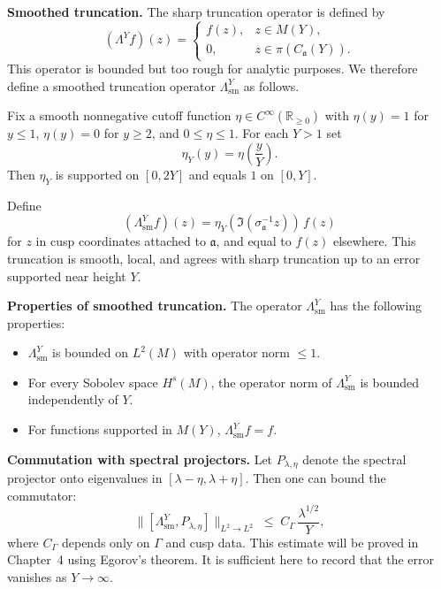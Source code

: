 \medskip

\noindent\textbf{Smoothed truncation.}
The sharp truncation operator is defined by
\[
  (\Lambda^{Y} f)(z) =
  \begin{cases}
    f(z), & z\in M(Y), \\
    0, & z\in \pi(C_{\mathfrak{a}}(Y)).
  \end{cases}
\]
This operator is bounded but too rough for analytic purposes.
We therefore define a smoothed truncation operator $\Lambda^{Y}_{\mathrm{sm}}$ as follows.

\medskip

Fix a smooth nonnegative cutoff function $\eta\in C^{\infty}(\mathbb{R}_{\ge0})$ with
$\eta(y)=1$ for $y\le 1$, $\eta(y)=0$ for $y\ge 2$, and $0\le \eta\le 1$.
For each $Y>1$ set
\[
  \eta_{Y}(y) = \eta\!\left(\frac{y}{Y}\right).
\]
Then $\eta_{Y}$ is supported on $[0,2Y]$ and equals $1$ on $[0,Y]$.

\medskip

Define
\[
  (\Lambda^{Y}_{\mathrm{sm}} f)(z)
  = \eta_{Y}(\Im(\sigma_{\mathfrak{a}}^{-1} z)) \, f(z)
\]
for $z$ in cusp coordinates attached to $\mathfrak{a}$,
and equal to $f(z)$ elsewhere.
This truncation is smooth, local, and agrees with sharp truncation up to an error supported near height $Y$.

\medskip

\noindent\textbf{Properties of smoothed truncation.}
The operator $\Lambda^{Y}_{\mathrm{sm}}$ has the following properties:
\begin{itemize}
  \item $\Lambda^{Y}_{\mathrm{sm}}$ is bounded on $L^{2}(M)$ with operator norm $\le 1$.
  \item For every Sobolev space $H^{s}(M)$, the operator norm of $\Lambda^{Y}_{\mathrm{sm}}$
        is bounded independently of $Y$.
  \item For functions supported in $M(Y)$, $\Lambda^{Y}_{\mathrm{sm}}f=f$.
\end{itemize}

\medskip

\noindent\textbf{Commutation with spectral projectors.}
Let $P_{\lambda,\eta}$ denote the spectral projector onto eigenvalues in $[\lambda-\eta,\lambda+\eta]$.
Then one can bound the commutator:
\[
  \big\| [\Lambda^{Y}_{\mathrm{sm}}, P_{\lambda,\eta}] \big\|_{L^{2}\to L^{2}}
  \;\le\; C_{\Gamma}\,\frac{\lambda^{1/2}}{Y},
\]
where $C_{\Gamma}$ depends only on $\Gamma$ and cusp data.
This estimate will be proved in Chapter~4 using Egorov’s theorem.
It is sufficient here to record that the error vanishes as $Y\to\infty$.

